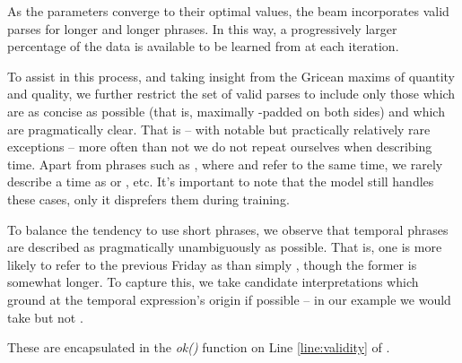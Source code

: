 As the parameters converge to their optimal values, the beam incorporates
	valid parses for longer and longer phrases.
In this way, a progressively larger percentage of the data is available to be
	learned from at each iteration.

To assist in this process, and taking insight from the Gricean 
	maxims of quantity and quality, we further restrict the set of valid 
	parses to include only those which are as concise as possible
	(that is, maximally -padded on both sides) 
	and which are pragmatically clear.
That is -- with notable but practically relatively rare exceptions --
	more often than not we do not repeat ourselves when describing time.
Apart from phrases such as , where 
	and  refer to the same time, we rarely describe a time as
	 or , etc.
It's important to note that the model still handles these cases, only it
	disprefers them during training.

To balance the tendency to use short phrases, we observe that
	temporal phrases are described as pragmatically unambiguously as possible.
That is, one is more likely to refer to the previous Friday as 
	than simply , though the former is somewhat longer.
To capture this, we take candidate interpretations which ground at the
	temporal expression's origin if possible --
	in our example we would take  but not .

These are encapsulated in the \textit{ok()} function
	on Line \ref{line:validity} of .

